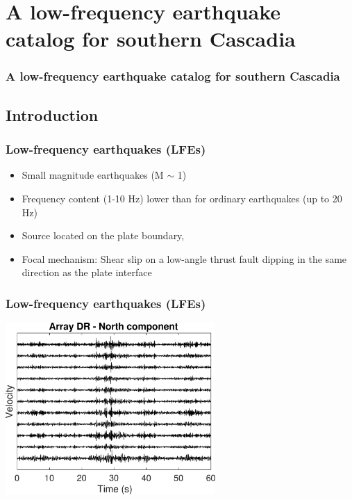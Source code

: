 \documentclass{beamer}
\begin{document}

	\section{A low-frequency earthquake catalog for southern Cascadia}

	\begin{frame}
		\frametitle{A low-frequency earthquake catalog for southern Cascadia}
	\end{frame}


	\subsection{Introduction}

	\begin{frame}
		\frametitle{Low-frequency earthquakes (LFEs)}
		\begin{itemize}
			\item Small magnitude earthquakes (M $\sim$ 1)
			\item Frequency content (1-10 Hz) lower than for ordinary earthquakes (up to 20 Hz)
			\item Source located on the plate boundary,
			\item Focal mechanism: Shear slip on a low-angle thrust fault dipping in the same direction as the plate interface
		\end{itemize}
	\end{frame}

	\begin{frame}
		\frametitle{Low-frequency earthquakes (LFEs)}
		\begin{center}
			\includegraphics[trim={0cm 0cm 0cm 0cm}, clip, width=8cm]{ETS/LFE_NS.eps}
		\end{center}
	\end{frame}
\end{document}
